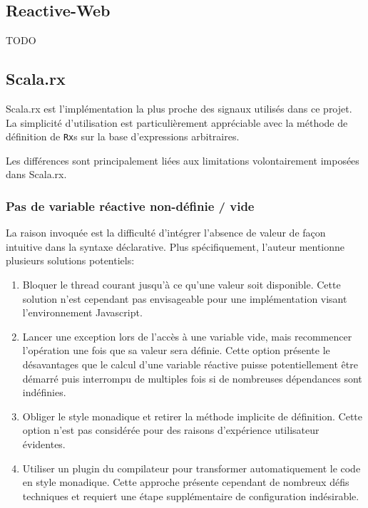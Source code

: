 	
		
	\subsection{Reactive-Web}
	
	TODO
	
	\subsection{Scala.rx}
	
	Scala.rx est l'implémentation la plus proche des signaux utilisés dans ce projet. La simplicité d'utilisation est particulièrement appréciable avec la méthode de définition de \texttt{Rx}s sur la base d'expressions arbitraires.
	
	Les différences sont principalement liées aux limitations volontairement imposées dans Scala.rx.
	
	\subsubsection{Pas de variable réactive non-définie / vide}
	
	La raison invoquée est la difficulté d'intégrer l'absence de valeur de façon intuitive dans la syntaxe déclarative. Plus spécifiquement, l'auteur mentionne plusieurs solutions potentiels:
	\begin{enumerate}
		\item Bloquer le thread courant jusqu'à ce qu'une valeur soit disponible. Cette solution n'est cependant pas envisageable pour une implémentation visant l'environnement Javascript.
		\item Lancer une exception lors de l'accès à une variable vide, mais recommencer l'opération une fois que sa valeur sera définie. Cette option présente le désavantages que le calcul d'une variable réactive puisse potentiellement être démarré puis interrompu de multiples fois si de nombreuses dépendances sont indéfinies.
		\item Obliger le style monadique et retirer la méthode implicite de définition. Cette option n'est pas considérée pour des raisons d'expérience utilisateur évidentes.
		\item Utiliser un plugin du compilateur pour transformer automatiquement le code en style monadique. Cette approche présente cependant de nombreux défis techniques et requiert une étape supplémentaire de configuration indésirable.
	\end{enumerate}

